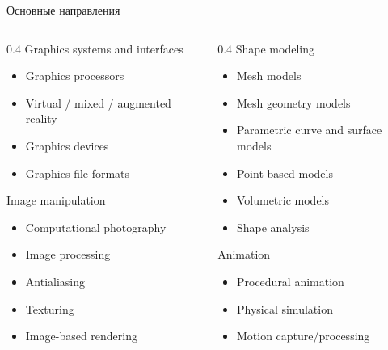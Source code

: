\documentclass{beamer}
\begin{document}
\begin{frame}{Основные направления}
{			\begin{columns}
				\scriptsize
				\begin{column}{0.4\textwidth}
					Graphics systems and interfaces
					\begin{itemize}
						\itemsep0pt
						\item Graphics processors
						\item Virtual / mixed / augmented reality
						\item Graphics devices
						\item Graphics file formats
					\end{itemize}
					Image manipulation
					\begin{itemize}
						\itemsep0pt
						\item Computational photography
						\item Image processing
						\item Antialiasing
						\item Texturing
						\item Image-based rendering
					\end{itemize}
				\end{column}
				\begin{column}{0.4\textwidth}
					Shape modeling
					\begin{itemize}
						\itemsep0pt
						\item Mesh models
						\item Mesh geometry models
						\item Parametric curve and surface models
						\item Point-based models
						\item Volumetric models
						\item Shape analysis
					\end{itemize}
					Animation
					\begin{itemize}
						\itemsep0pt
						\item Procedural animation
						\item Physical simulation
						\item Motion capture/processing
					\end{itemize}

				\end{column}
			\end{columns}
		}

		\end{frame}
\end{document}
